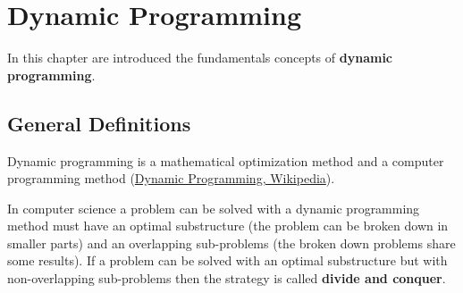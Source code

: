 \chapter{Dynamic Programming}
\label{chp:dynamicprogramming}
In this chapter are introduced the fundamentals concepts of \textbf{dynamic programming}.
 
\section{General Definitions}
Dynamic programming is a mathematical optimization method and a computer programming method \cite{wikidynamicprogramming} (\href{https://en.wikipedia.org/wiki/Dynamic_programming}{Dynamic Programming, Wikipedia}).

In computer science a problem can be solved with a dynamic programming method must have an optimal substructure (the problem can be broken down in smaller parts) and an overlapping sub-problems (the broken down problems share some results). If a problem can be solved with an optimal substructure but with non-overlapping sub-problems then the strategy is called \textbf{divide and conquer}.
